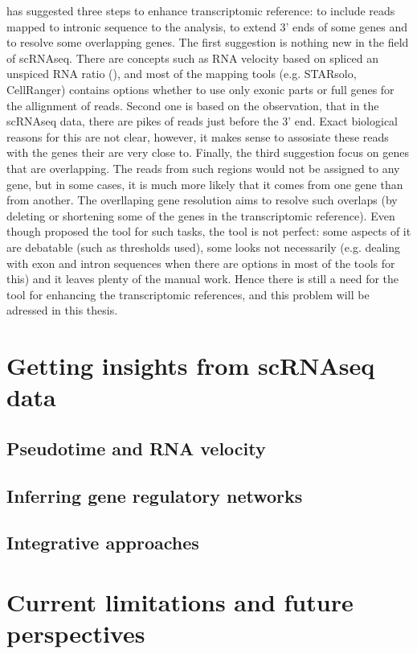 \textcite{Pool2023} has suggested three steps to enhance transcriptomic reference:
to include reads mapped to intronic sequence to the analysis, to extend 3' ends of some genes and
to resolve some overlapping genes.
The first suggestion is nothing new in the field of scRNAseq.
There are concepts such as RNA velocity based on spliced an unspiced RNA ratio (\cite{Manno2018}),
and most of the mapping tools (e.g. STARsolo, CellRanger) contains options whether
to use only exonic parts or full genes for the allignment of reads.
Second one is based on the observation, that in the scRNAseq data, there are pikes of reads just before the 3' end.
Exact biological reasons for this are not clear, however,
it makes sense to assosiate these reads with the genes their are very close to.
Finally, the third suggestion focus on genes that are overlapping.
The reads from such regions would not be assigned to any gene, but in some cases,
it is much more likely that it comes from one gene than from another.
The overllaping gene resolution aims to resolve such overlaps
(by deleting or shortening some of the genes in the transcriptomic reference).
Even though \textcite{Pool2023} proposed the tool for such tasks, the tool is not perfect:
some aspects of it are debatable (such as thresholds used), some looks not necessarily
(e.g. dealing with exon and intron sequences when there are options in most of the tools for this)
and it leaves plenty of the manual work.
Hence there is still a need for the tool for enhancing the transcriptomic references,
and this problem will be adressed in this thesis.

\section{Getting insights from scRNAseq data}

\subsection{Pseudotime and RNA velocity}

\subsection{Inferring gene regulatory networks}

\subsection{Integrative approaches}

\section{Current limitations and future perspectives}

